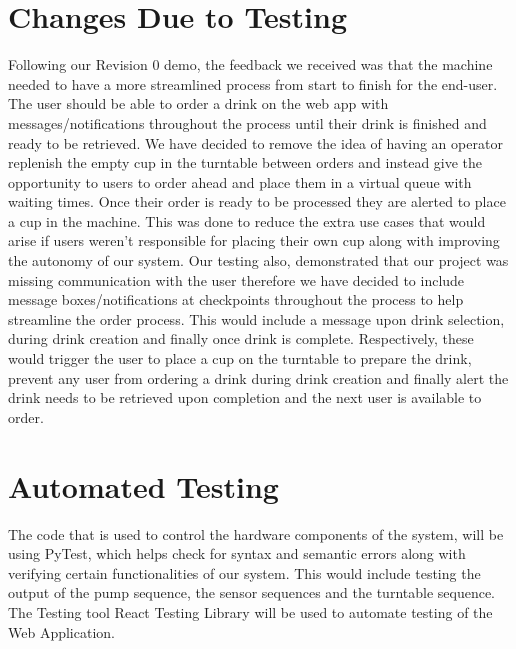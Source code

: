 \documentclass[12pt, titlepage]{article}
\begin{document}
\section{Changes Due to Testing}
\tab Following our Revision 0 demo, the feedback we received was that the machine needed to have a more streamlined process from start to finish for the end-user. The user should be able to order a drink on the web app with messages/notifications throughout the process until their drink is finished and ready to be retrieved. We have decided to remove the idea of having an operator replenish the empty cup in the turntable between orders and instead give the opportunity to users to order ahead and place them in a virtual queue with waiting times. Once their order is ready to be processed they are alerted to place a cup in the machine. This was done to reduce the extra use cases that would arise if users weren't responsible for placing their own cup along with improving the autonomy of our system. Our testing also, demonstrated that our project was missing communication with the user therefore we have decided to include message boxes/notifications at checkpoints throughout the process to help streamline the order process. This would include a message upon drink selection, during drink creation and finally once drink is complete. Respectively, these would trigger the user to place a cup on the turntable to prepare the drink, prevent any user from ordering a drink during drink creation and finally alert the drink needs to be retrieved upon completion and the next user is available to order. 

\section{Automated Testing}
The code that is used to control the hardware components of the system, will be using PyTest, which helps check for syntax and semantic errors along with verifying certain functionalities of our system. This would include testing the output of the pump sequence, the sensor sequences and the turntable sequence. The Testing tool React Testing Library will be used to automate testing of the Web Application.
		
\end{document}
